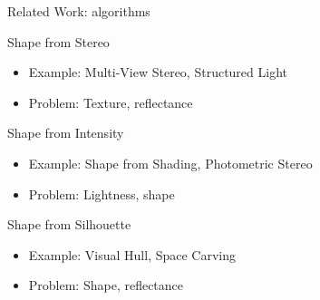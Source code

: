 \documentclass[10pt]{beamer}
\begin{document}
\begin{frame}{Related Work: algorithms}

\begin{exampleblock}{Shape from Stereo}
  \begin{itemize}
    \item Example: Multi-View Stereo, Structured Light
    \item Problem: Texture, reflectance
  \end{itemize}
\end{exampleblock}

\begin{exampleblock}{Shape from Intensity}
  \begin{itemize}
    \item Example: Shape from Shading, Photometric Stereo
    \item Problem: Lightness, shape
  \end{itemize}
\end{exampleblock}

\begin{exampleblock}{Shape from Silhouette}
  \begin{itemize}
    \item Example: Visual Hull, Space Carving
    \item Problem: Shape, reflectance
  \end{itemize}
\end{exampleblock}



\end{frame}
\end{document}
